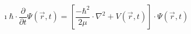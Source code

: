 \begin{equation*}
    \imath\hbar
    \cdot
    \frac{\partial}{\partial t}\Psi\left(\vec{r},t\right)
    =
    \left[
        \frac{-\hbar^2}{2\mu}\cdot\nabla^2
        +
        V\left(\vec{r},t\right)
    \right]
    \cdot
    \Psi\left(\vec{r},t\right)
\end{equation*}